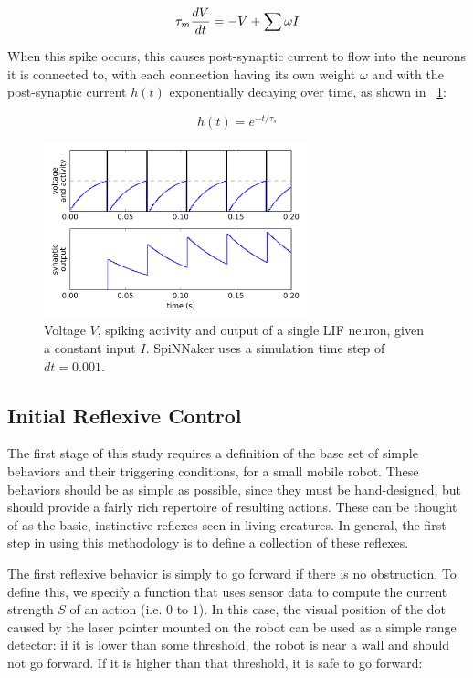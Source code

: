 \documentclass[conference]{IEEEtran}
\begin{document}
\begin{equation}
    \tau_m {dV \over dt} = -V + \sum \omega I
\end{equation}

When this spike occurs, this causes post-synaptic current to flow into the 
neurons it is connected to, with each connection having its own weight $\omega$
and with the post-synaptic current $h(t)$ exponentially decaying over time, 
as shown in \figurename~\ref{Neuron}:

\begin{equation}
    h(t) = e^{-t/\tau_s}
\end{equation}

\begin{figure}[!t]
\centering
\includegraphics[width=3in]{neuron.png}
\caption{Voltage $V$, spiking activity and output of a single LIF neuron, given a constant input $I$.
SpiNNaker uses a simulation time step of $dt=0.001$.}
\label{Neuron}
\end{figure}

\subsection{Initial Reflexive Control}
The first stage of this study requires a definition of the base set of simple 
behaviors and their triggering conditions, for a small mobile robot. These 
behaviors should be as simple as possible, since they must be hand-designed, 
but should provide a fairly rich repertoire of resulting actions. These can be 
thought of as the basic, instinctive reflexes seen in living creatures. In
general, the first step in using this methodology is to define a collection
of these reflexes.

The first reflexive behavior is simply to go forward if there is no 
obstruction. To define this, we specify a function that uses sensor data to 
compute the current strength $S$ of an action (i.e. $0$ to $1$). In this 
case, the visual position of the dot caused by the laser pointer mounted on
the robot can be used as a simple range 
detector: if it is lower than some threshold, the robot is near a wall and 
should not go forward. If it is higher than that threshold, it is safe to 
go forward: 
\end{document}
